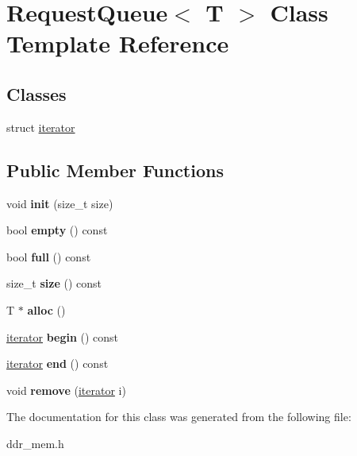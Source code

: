 \hypertarget{classRequestQueue}{\section{Request\-Queue$<$ T $>$ Class Template Reference}
\label{classRequestQueue}
}
\subsection*{Classes}
\begin{DoxyCompactItemize}
\item 
struct \hyperlink{structRequestQueue_1_1iterator}{iterator}
\end{DoxyCompactItemize}
\subsection*{Public Member Functions}
\begin{DoxyCompactItemize}
\item 
\hypertarget{classRequestQueue_a3de3cb741c19987ee54c04700d72f045}{void {\bfseries init} (size\-\_\-t size)}\label{classRequestQueue_a3de3cb741c19987ee54c04700d72f045}

\item 
\hypertarget{classRequestQueue_a074addcdcf92ca2b5c019d24254adbae}{bool {\bfseries empty} () const }\label{classRequestQueue_a074addcdcf92ca2b5c019d24254adbae}

\item 
\hypertarget{classRequestQueue_a356014fe9b3e72b5cfcdd76bb3689328}{bool {\bfseries full} () const }\label{classRequestQueue_a356014fe9b3e72b5cfcdd76bb3689328}

\item 
\hypertarget{classRequestQueue_ad38086a975ee9d2c248edf746cc1eb0e}{size\-\_\-t {\bfseries size} () const }\label{classRequestQueue_ad38086a975ee9d2c248edf746cc1eb0e}

\item 
\hypertarget{classRequestQueue_a87be98aa9318f21b02489e051355ace5}{T $\ast$ {\bfseries alloc} ()}\label{classRequestQueue_a87be98aa9318f21b02489e051355ace5}

\item 
\hypertarget{classRequestQueue_acd433ae477b91236b17ec0225205b52a}{\hyperlink{structRequestQueue_1_1iterator}{iterator} {\bfseries begin} () const }\label{classRequestQueue_acd433ae477b91236b17ec0225205b52a}

\item 
\hypertarget{classRequestQueue_a950534759815da071a4709f3013fbacf}{\hyperlink{structRequestQueue_1_1iterator}{iterator} {\bfseries end} () const }\label{classRequestQueue_a950534759815da071a4709f3013fbacf}

\item 
\hypertarget{classRequestQueue_a3a070fe9dc7ec6894ae72cf930fef155}{void {\bfseries remove} (\hyperlink{structRequestQueue_1_1iterator}{iterator} i)}\label{classRequestQueue_a3a070fe9dc7ec6894ae72cf930fef155}

\end{DoxyCompactItemize}


The documentation for this class was generated from the following file\-:\begin{DoxyCompactItemize}
\item 
ddr\-\_\-mem.\-h\end{DoxyCompactItemize}
